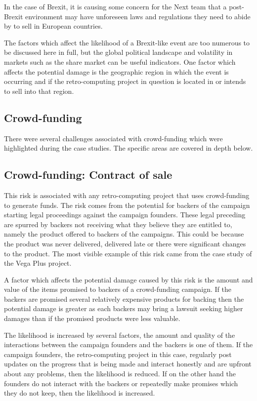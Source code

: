 In the case of Brexit, it is causing some concern for the Next team that a post-Brexit environment may have unforeseen laws and regulations they need to abide by to sell in European countries. 

The factors which affect the likelihood of a Brexit-like event are too numerous to be discussed here in full, but the global political landscape and volatility in markets such as the share market can be useful indicators. One factor which affects the potential damage is the geographic region in which the event is occurring and if the retro-computing project in question is located in or intends to sell into that region.

\subsection{Crowd-funding}
There were several challenges associated with crowd-funding which were highlighted during the case studies. The specific areas are covered in depth below. 


\subsection{Crowd-funding: Contract of sale}
This risk is associated with any retro-computing project that uses crowd-funding to generate funds. The risk comes from the potential for backers of the campaign starting legal proceedings against the campaign founders. These legal preceding are spurred by backers not receiving what they believe they are entitled to, namely the product offered to backers of the campaigns. This could be because the product was never delivered, delivered late or there were significant changes to the product. The most visible example of this risk came from the case study of the Vega Plus project.  

A factor which affects the potential damage caused by this risk is the amount and value of the items promised to backers of a crowd-funding campaign. If the backers are promised several relatively expensive products for backing then the potential damage is greater as each backers may bring a lawsuit seeking higher damages than if the promised products were less valuable. 

The likelihood is increased by several factors, the amount and quality of the interactions between the campaign founders and the backers is one of them. If the campaign founders, the retro-computing project in this case, regularly post updates on the progress that is being made and interact honestly and are upfront about any problems, then the likelihood is reduced. If on the other hand the founders do not interact with the backers or repeatedly make promises which they do not keep, then the likelihood is increased.

